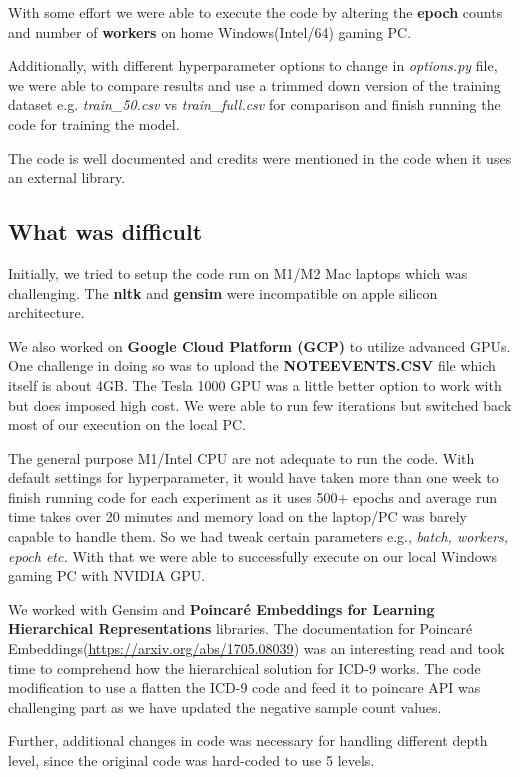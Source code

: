 \documentclass[11pt,a4paper]{article}
\begin{document}
With some effort we were able to execute the code by altering the \textbf{epoch} counts and number of \textbf{workers} on home Windows(Intel/64) gaming PC.

Additionally, with different hyperparameter options to change in \textit{options.py} file, we were able to compare results and use a trimmed down version of the training dataset e.g. \textit{train\_50.csv} vs \textit{train\_full.csv} for comparison and finish running the code for training the model.

The code is well documented and credits were mentioned in the code when it uses an external library. 

\subsection{What was difficult}
Initially, we tried to setup the code run on M1/M2 Mac laptops which was challenging. The \textbf{nltk} and \textbf{gensim} were incompatible on apple silicon architecture. 

We also worked on \textbf{Google Cloud Platform (GCP)} to utilize advanced GPUs. One challenge in doing so was to upload the \textbf{NOTEEVENTS.CSV} file which itself is about 4GB. The Tesla 1000 GPU was a little better option to work with but does imposed high cost. We were able to run few iterations but switched back most of our execution on the local  PC.

The general purpose M1/Intel CPU are not adequate to run the code. With default settings for hyperparameter, it would have taken more than one week to finish running code for each experiment as it uses 500+ epochs and average run time takes over 20 minutes and memory load on the laptop/PC was barely capable to handle them. So we had tweak certain parameters e.g., \textit{batch, workers, epoch etc.} With that we were able to successfully execute on our local Windows gaming PC with NVIDIA GPU.

We worked with Gensim and \textbf{Poincaré Embeddings for Learning Hierarchical Representations} libraries. The documentation for Poincaré Embeddings(\url{https://arxiv.org/abs/1705.08039}) was an interesting read and took time to comprehend how the hierarchical solution for ICD-9 works. The code modification to use a flatten the ICD-9 code and feed it to poincare API was challenging part as we have updated the negative sample count values.

Further, additional changes in code was necessary for handling different depth level, since the original code was hard-coded to use 5 levels.
\end{document}
